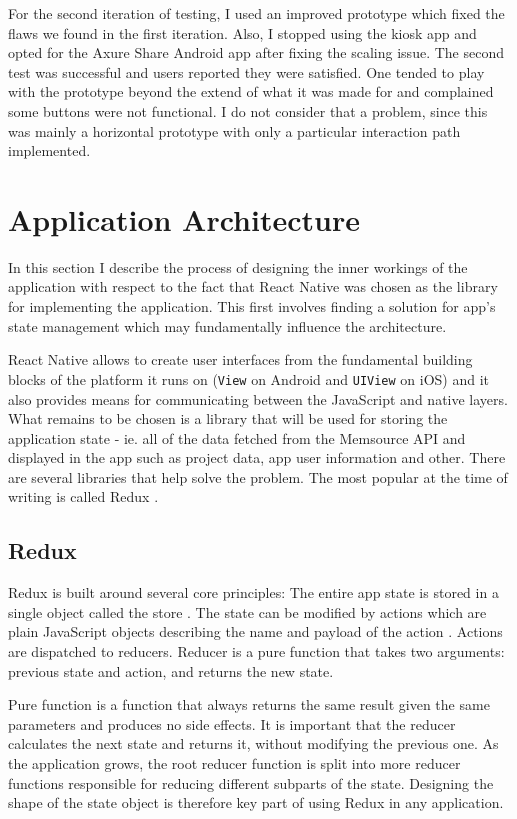 For the second iteration of testing, I used an improved prototype which fixed the flaws we found in the first iteration. Also, I stopped using the kiosk app and opted for the Axure Share Android app after fixing the scaling issue. The second test was successful and users reported they were satisfied. One tended to play with the prototype beyond the extend of what it was made for and complained some buttons were not functional. I do not consider that a problem, since this was mainly a horizontal prototype with only a particular interaction path implemented.



\section{Application Architecture}

In this section I describe the process of designing the inner workings of the application with respect to the fact that React Native was chosen as the library for implementing the application. This first involves finding a solution for app's state management which may fundamentally influence the architecture.


React Native allows to create user interfaces from the fundamental building blocks of the platform it runs on (\texttt{View} on Android and \texttt{UIView} on iOS) and it also provides means for communicating between the JavaScript and native layers. What remains to be chosen is a library that will be used for storing the application state - ie. all of the data fetched from the Memsource API and displayed in the app such as project data, app user information and other. There are several libraries that help solve the problem. The most popular at the time of writing is called Redux \cite{stateOfJS}.

\subsection{Redux}

Redux is built around several core principles:
The entire app state is stored in a single object called the store \cite{redux:store}. The state can be modified by actions which are plain JavaScript objects describing the name and payload of the action \cite{redux:store}. Actions are dispatched to reducers. Reducer is a pure function that takes two arguments: previous state and action, and returns the new state.

Pure function  is a function that always returns the same result given the same parameters and produces no side effects. It is important that the reducer calculates the next state and returns it, without modifying the previous one.
As the application grows, the root reducer function is split into more reducer functions responsible for reducing different subparts of the state. Designing the shape of the state object is therefore key part of using Redux in any application.

